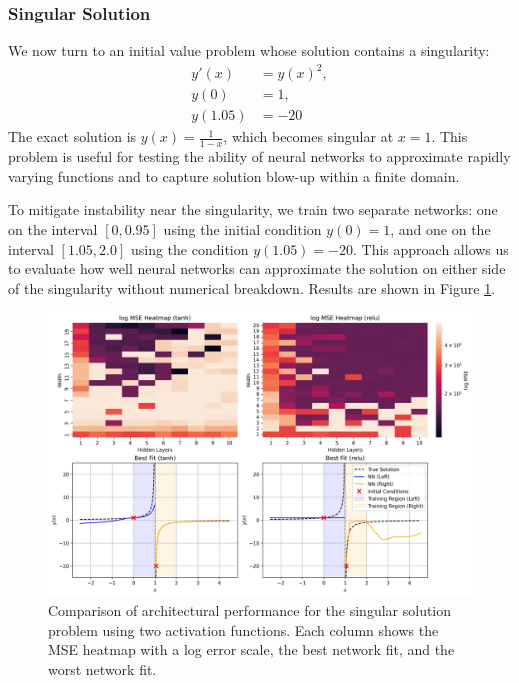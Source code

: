 \subsubsection{Singular Solution}

We now turn to an initial value problem whose solution contains a singularity:
\[
\begin{aligned}
    y'(x) &= y(x)^2, \\
    y(0) &= 1, \\
    y(1.05) &= -20
\end{aligned}
\]
The exact solution is \( y(x) = \frac{1}{1 - x} \), which becomes singular at \( x = 1 \). This 
problem is useful for testing the ability of neural networks to approximate rapidly varying functions 
and to capture solution blow-up within a finite domain.

To mitigate instability near the singularity, we train two separate networks: one on the interval 
\([0, 0.95]\) using the initial condition \( y(0) = 1 \), and one on the interval \([1.05, 2.0] \) 
using the condition \( y(1.05) = -20 \). This approach allows us to evaluate how 
well neural networks can approximate the solution on either side of the singularity without 
numerical breakdown. Results are shown in Figure \ref{fig:ivp_singular_sidebyside}.

\begin{figure}[h]
    \centering
    \includegraphics[width=\textwidth]{graphics/ivp_singularity_combined.png}
    \caption{Comparison of architectural performance for the singular solution problem using two 
    activation functions. Each column shows the MSE heatmap with a log error scale,
    the best network fit, and the worst network fit.}
    \label{fig:ivp_singular_sidebyside}
\end{figure}

